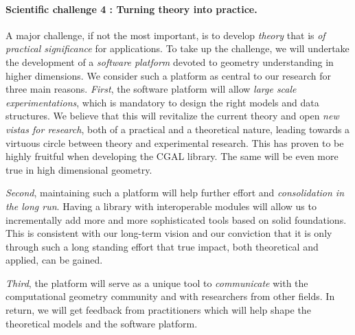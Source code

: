 \vspace{-1mm}

\paragraph{Scientific challenge 4 : Turning theory into practice.}
A major challenge, if not the most important, is to develop {\em theory} that is {\em of practical significance} for applications.  To take up the challenge, we will %
undertake the development of a {\em software platform} devoted to geometry understanding in higher dimensions.  We consider such a platform as central to our research for three main reasons.  {\em First}, the software platform will allow {\em large scale experimentations}, which is mandatory to design the right models and data structures. We believe that this will revitalize the current theory and open {\em new vistas for research}, both of a practical and a theoretical nature, leading towards a virtuous circle between theory and experimental research. This has proven to be highly fruitful when developing the CGAL library. The same will be even more true in high dimensional geometry.

{\em Second}, maintaining such a platform will help further effort and {\em consolidation in the long run}.  Having a library with interoperable modules will allow us to incrementally add more and more sophisticated tools based on solid foundations.  This is consistent with our long-term vision and our conviction that it is only through such a long standing effort that true impact, both theoretical and applied, can be gained.

{\em Third}, the platform will serve as a unique tool to {\em communicate} with the computational geometry community and with researchers from other fields. 
 In return, we will get feedback from practitioners which will help shape the theoretical models and the software platform.
\vspace{-1mm} 

